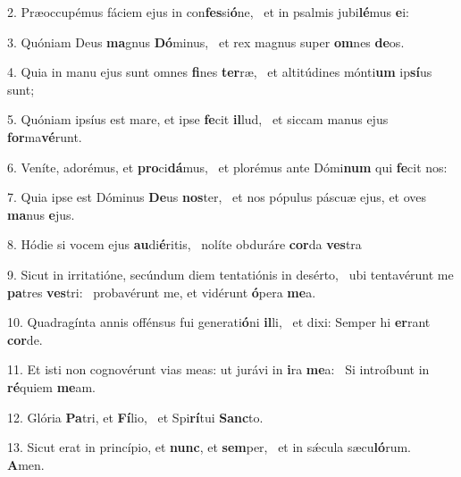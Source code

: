 2. Præoccupémus fáciem ejus in con\textbf{fes}si\textbf{ó}ne, \ast\  et in psalmis jubi\textbf{lé}mus \textbf{e}i:\

3. Quóniam Deus \textbf{ma}gnus \textbf{Dó}minus, \ast\  et rex magnus super \textbf{om}nes \textbf{de}os.\

4. Quia in manu ejus sunt omnes \textbf{fi}nes \textbf{ter}ræ, \ast\  et altitúdines mónti\textbf{um} ip\textbf{sí}us sunt;\

5. Quóniam ipsíus est mare, et ipse \textbf{fe}cit \textbf{il}lud, \ast\  et siccam manus ejus \textbf{for}ma\textbf{vé}runt.\

6. Veníte, adorémus, et \textbf{pro}ci\textbf{dá}mus, \ast\  et plorémus ante Dómi\textbf{num} qui \textbf{fe}cit nos:\

7. Quia ipse est Dóminus \textbf{De}us \textbf{nos}ter, \ast\  et nos pópulus páscuæ ejus, et oves \textbf{ma}nus \textbf{e}jus.\

8. Hódie si vocem ejus \textbf{au}di\textbf{é}ritis, \ast\  nolíte obduráre \textbf{cor}da \textbf{ves}tra\

9. Sicut in irritatióne, secúndum diem tentatiónis in desérto, \dag\  ubi tentavérunt me \textbf{pa}tres \textbf{ves}tri: \ast\  probavérunt me, et vidérunt \textbf{ó}pera \textbf{me}a.\

10. Quadragínta annis offénsus fui generati\textbf{ó}ni \textbf{il}li, \ast\  et dixi: Semper hi \textbf{er}rant \textbf{cor}de.\

11. Et isti non cognovérunt vias meas: ut jurávi in \textbf{i}ra \textbf{me}a: \ast\  Si introíbunt in \textbf{ré}quiem \textbf{me}am.\

12. Glória \textbf{Pa}tri, et \textbf{Fí}lio, \ast\  et Spi\textbf{rí}tui \textbf{Sanc}to.\

13. Sicut erat in princípio, et \textbf{nunc}, et \textbf{sem}per, \ast\  et in sǽcula sæcu\textbf{ló}rum. \textbf{A}men.\


